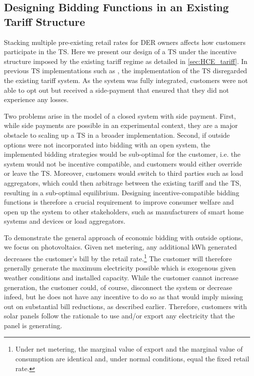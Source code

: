 \subsection{Designing Bidding Functions in an Existing Tariff Structure}\label{sec:HCE_design}

Stacking multiple pre-existing retail rates for DER owners affects how customers participate in the TS. Here we present our design of a TS under the incentive structure imposed by the existing tariff regime as detailed in \cref{sec:HCE_tariff}. 
In previous TS implementations such as \citet{hammerstrom_2008}, the implementation of the TS disregarded the existing tariff system. As the system was fully integrated, customers were not able to opt out but received a side-payment that ensured that they did not experience any losses.

Two problems arise in the model of a closed system with side payment. 
First, while side payments are possible in an experimental context, they are a major obstacle to scaling up a TS in a broader implementation. 
Second, if outside options were not incorporated into bidding with an open system, the implemented bidding strategies would be sub-optimal for the customer, i.e. the system would not be incentive compatible, and customers would either override or leave the TS. Moreover, customers would switch to third parties such as load aggregators, which could then arbitrage between the existing tariff and the TS, resulting in a sub-optimal equilibrium.
Designing incentive-compatible bidding functions is therefore a crucial requirement to improve consumer welfare and open up the system to other stakeholders, such as manufacturers of smart home systems and devices or load aggregators.

To demonstrate the general approach of economic bidding with outside options, we focus on photovoltaics.
Given net metering, any additional kWh generated decreases the customer's bill by the retail rate.\footnote{Under net metering, the marginal value of export and the marginal value of consumption are identical and, under normal conditions, equal the fixed retail rate.}
The customer will therefore generally generate the maximum electricity possible which is exogenous given weather conditions and installed capacity.
While the customer cannot increase generation, the customer could, of course, disconnect the system or decrease infeed, but he does not have any incentive to do so as that would imply missing out on substantial bill reductions, as described earlier. 
Therefore, customers with solar panels follow the rationale to use and/or export any electricity that the panel is generating.

